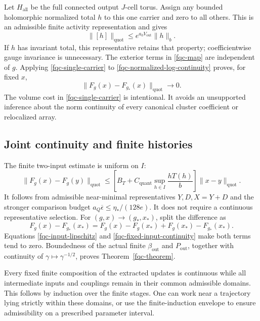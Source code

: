 \documentclass[11pt]{article}
\theoremstyle{remark}
\begin{document}
Let $H_{\mathrm{all}}$ be the full connected output $J$-cell
torus. Assign any bounded holomorphic normalized total $h$ to
this one carrier and zero to all others. This is an admissible
finite activity representation and gives
\begin{equation}
 \lVert[h]\rVert_{\mathrm{quot}}
       \leq e^{a_0V_{\mathrm{out}}}\lVert h\rVert_b.
 \label{fqc-single-carrier}
\end{equation}
If $h$ has invariant total, this representative retains that
property; coefficientwise gauge invariance is unnecessary.
The exterior terms in \eqref{fqc-map} are independent of $g$.
Applying \eqref{fqc-single-carrier} to
\eqref{fqc-normalized-log-continuity} proves, for fixed $x$,
\begin{equation}
 \lVert F_g(x)-F_{g_*}(x)\rVert_{\mathrm{quot}}
       \longrightarrow0.
 \label{fqc-fixed-input-continuity}
\end{equation}
The volume cost in \eqref{fqc-single-carrier} is intentional.
It avoids an unsupported inference about the norm continuity
of every canonical cluster coefficient or relocalized array.

\subsection{Joint continuity and finite histories}
\label{fqc-joint-section}

The finite two-input estimate is uniform on $I$:
\begin{equation}
 \lVert F_g(x)-F_g(y)\rVert_{\mathrm{quot}}
 \leq
 \left[B_T+C_{\mathrm{quant}}
                  \sup_{h\in I}\frac{hT(h)}b\right]
       \lVert x-y\rVert_{\mathrm{quot}}.
 \label{fqc-input-lipschitz}
\end{equation}
It follows from admissible near-minimal representatives
$Y,D,X=Y+D$ and the stronger comparison budget
$a_Q\overline\epsilon\leq\eta_*/(128e)$. It does not require
a continuous representative selection. For $(g,x)\to(g_*,x_*)$,
split the difference as
\[
 F_g(x)-F_{g_*}(x_*)
   =F_g(x)-F_g(x_*)+F_g(x_*)-F_{g_*}(x_*).
\]
Equations \eqref{fqc-input-lipschitz} and
\eqref{fqc-fixed-input-continuity} make both terms tend to
zero. Boundedness of the actual finite $\beta_{\mathrm{out}}$
and $P_{\mathrm{out}}$, together with continuity of
$\gamma\mapsto\gamma^{-1/2}$, proves
Theorem~\ref{fqc-theorem}.

Every fixed finite composition of the extracted updates is
continuous while all intermediate inputs and couplings remain
in their common admissible domains. This follows by induction
over the finite stages. One can work near a trajectory lying
strictly within these domains, or use the finite-induction
envelope to ensure admissibility on a prescribed parameter
interval.
\end{document}
